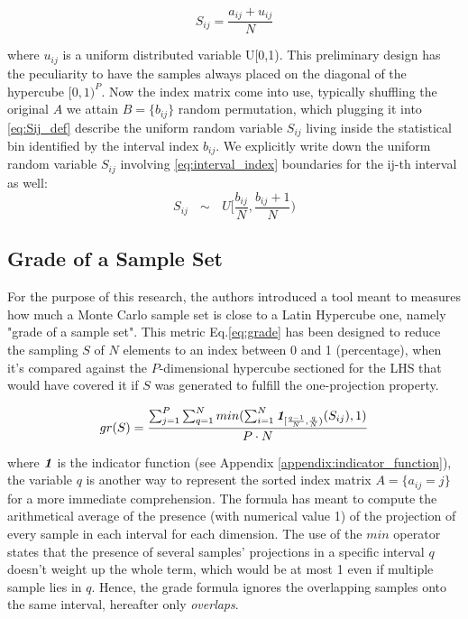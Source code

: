 \documentclass[12pt]{article}
\newcommand{\meqref}[1]{Eq.\ref{#1}}
\newcommand{\mappendixref}[1]{Appendix \ref{#1}}
\newcommand{\indfunc}[1]{\textit{\textbf{1}}_{#1}}
\begin{document}
\begin{equation}
\label{eq:Sij_def}
S_{ij} = \frac{a_{ij} + u_{ij}}{N}
\end{equation}

where $u_{ij}$ is a uniform distributed variable U[0,1). This preliminary design has the peculiarity to have the samples always placed on the diagonal of the hypercube $[0,1)^P$. Now the index matrix come into use, typically shuffling the original $A$ we attain $B = \{b_{ij}\}$ random permutation, which plugging it  into \cref{eq:Sij_def} describe the uniform random variable $S_{ij}$ living inside the statistical bin identified by the interval index $b_{ij}$. We explicitly write down the uniform random variable $S_{ij}$ involving \cref{eq:interval_index} boundaries for the ij-th interval as well: 
\begin{equation}
\label{eq:rand_variable_Sij}
S_{ij} \text{ $\sim$ } U\Big[\frac{b_{ij}}{N}, \frac{b_{ij} + 1}{N}\Big)
\end{equation}

\subsection{Grade of a Sample Set}
\label{subsec:lhs_grade}
For the purpose of this research, the authors introduced a tool meant to measures how much a Monte Carlo sample set is close to a Latin Hypercube one, namely "grade of a sample set". This metric \meqref{eq:grade} has been designed to reduce the sampling $S$ of $N$ elements to an index between 0 and 1 (percentage), when it's compared against the $P$-dimensional hypercube sectioned for the LHS that would have covered it if $S$ was generated to fulfill the one-projection property.

\begin{equation}
\label{eq:grade}
gr(S) = \frac{\sum^P_{j=1}\sum^N_{q=1} min(\sum^N_{i=1}\indfunc{[\frac{q-1}{N}, \frac{q}{N})}(S_{ij}), 1)}{P \cdot N}
\end{equation}

where $\indfunc{}$ is the indicator function (see \mappendixref{appendix:indicator_function}), the variable $q$ is another way to represent the sorted index matrix $A = \{a_{ij} = j \}$ for a more immediate comprehension. The formula has meant to compute the arithmetical average of the presence (with numerical value 1) of the projection of every sample in each interval for each dimension. The use of the $min$ operator states that the presence of several samples' projections in a specific interval $q$ doesn't weight up the whole term, which would be at most 1 even if multiple sample lies in $q$. Hence, the grade formula ignores the overlapping samples onto the same interval, hereafter only \textit{overlaps}. 
\end{document}
